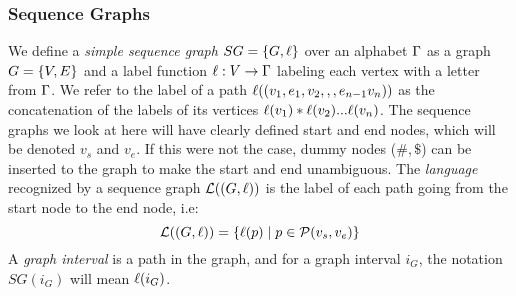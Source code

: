 \subsubsection{Sequence Graphs}
We define a \emph{simple sequence graph} $SG = \left\{G, \ell\right\}$ over an alphabet $\Gamma$ as a graph $G=\left\{V, E\right\}$ and a label function $\ell: V \rightarrow \Gamma$ labeling each vertex with a letter from $\Gamma$.
We refer to the label of a path $\ell((v_1, e_1, v_2,,,e_{n-1}v_n))$ as the concatenation of the labels of its vertices $\ell(v_1)*\ell(v_2) ... \ell(v_n)$.
The sequence graphs we look at here will have clearly defined start and end nodes, which will be denoted $v_s$ and $v_e$. If this were not the case, dummy nodes ($\#, \$$) can be inserted to the graph to make the start and end unambiguous.
The \emph{language} recognized by a sequence graph $\mathcal{L}((G, \ell))$ is the label of each path going from the start node to the end node, i.e:
\[
  \mathcal{L}((G, \ell)) = \left\{ \ell(p) \mid p \in \mathcal{P}(v_s, v_e)\right\}
\]
A \emph{graph interval} is a path in the graph, and for a graph interval $i_G$, the notation  $SG(i_G)$ will mean $\ell(i_G)$.

